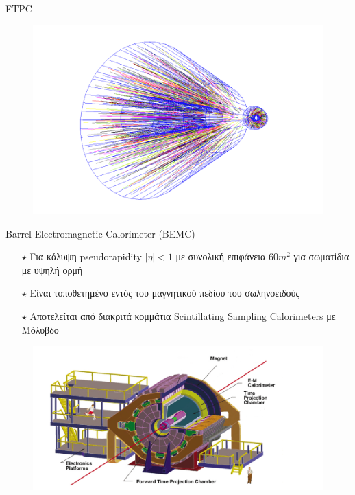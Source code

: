 \documentclass[18pt,notheorems,hyperref={pdfauthor=whatever}]{beamer}
\begin{document}
\begin{frame}{FTPC}
\begin{minipage}{0.5\textwidth}
\begin{figure}
            \includegraphics[scale=0.3]{images/FTPC_reconstruction.png}
        \end{figure}
    \end{minipage}
\end{frame}




\begin{frame}{Barrel Electromagnetic Calorimeter (BEMC)}
     \begin{minipage}{0.47\textwidth}
        \begin{itemize}
            \item[$\star$] Για κάλυψη pseudorapidity $|\eta|<1$ με συνολική επιφάνεια $60m^2$ για σωματίδια με υψηλή ορμή
            \item[$\star$] Είναι τοποθετημένο εντός του μαγνητικού πεδίου του σωληνοειδούς
            \item[$\star$] Αποτελείται από διακριτά κομμάτια Scintillating Sampling Calorimeters με Μόλυβδο
        \end{itemize}
    \end{minipage}
    \begin{minipage}{0.5\textwidth}
        \begin{figure}
            \centering
            \includegraphics[scale=0.5]{images/Star__BEMC.png}
        \end{figure}
    \end{minipage}
\end{frame}
\end{document}
